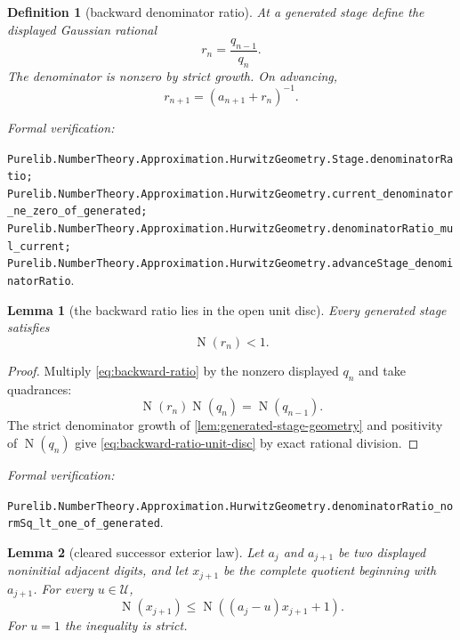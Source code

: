 \documentclass[11pt]{article}
\newtheorem{lemma}[lemma]{Lemma}
\newtheorem{definition}[definition]{Definition}
\newcommand{\Norm}[1]{\operatorname{N}\!\left(#1\right)}
\newcommand{\leanref}[1]{\par\smallskip\noindent
  \emph{Formal verification:}\par\nobreak
  {\raggedright\nolinkurl{#1}.\par}}
\begin{document}
\begin{definition}[backward denominator ratio]
\label{def:backward-ratio}
At a generated stage define the displayed Gaussian rational
\begin{equation}
\label{eq:backward-ratio}
                          r_n=\frac{q_{n-1}}{q_n}.
\end{equation}
The denominator is nonzero by strict growth.  On advancing,
\begin{equation}
\label{eq:backward-ratio-recurrence}
                         r_{n+1}=(a_{n+1}+r_n)^{-1}.
\end{equation}
\end{definition}

\leanref{Purelib.NumberTheory.Approximation.HurwitzGeometry.Stage.denominatorRatio;
Purelib.NumberTheory.Approximation.HurwitzGeometry.current_denominator_ne_zero_of_generated;
Purelib.NumberTheory.Approximation.HurwitzGeometry.denominatorRatio_mul_current;
Purelib.NumberTheory.Approximation.HurwitzGeometry.advanceStage_denominatorRatio}

\begin{lemma}[the backward ratio lies in the open unit disc]
\label{lem:backward-ratio-unit-disc}
Every generated stage satisfies
\begin{equation}
\label{eq:backward-ratio-unit-disc}
                              \Norm{r_n}<1.
\end{equation}
\end{lemma}

\begin{proof}
Multiply \eqref{eq:backward-ratio} by the nonzero displayed $q_n$ and take
quadrances:
\[
                       \Norm{r_n}\Norm{q_n}=\Norm{q_{n-1}}.
\]
The strict denominator growth of
\cref{lem:generated-stage-geometry} and positivity of $\Norm{q_n}$ give
\eqref{eq:backward-ratio-unit-disc} by exact rational division.
\end{proof}

\leanref{Purelib.NumberTheory.Approximation.HurwitzGeometry.denominatorRatio_normSq_lt_one_of_generated}

\begin{lemma}[cleared successor exterior law]
\label{lem:successor-exterior}
Let $a_{j}$ and $a_{j+1}$ be two displayed noninitial adjacent digits, and
let $x_{j+1}$ be the complete quotient beginning with $a_{j+1}$.  For every
$u\in\mathcal U$,
\begin{equation}
\label{eq:successor-exterior}
 \Norm{x_{j+1}}
 \le
 \Norm{(a_j-u)x_{j+1}+1}.
\end{equation}
For $u=1$ the inequality is strict.
\end{lemma}
\end{document}
